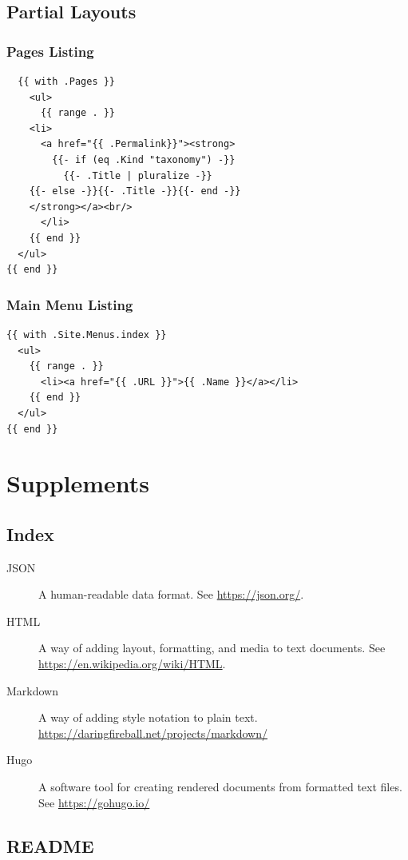\documentclass[11pt]{article}
\begin{document}
\subsection*{Partial Layouts}
\label{sec:orgff63913}
\subsubsection*{Pages Listing}
\label{sec:orgb986bf1}
\begin{verbatim}
  {{ with .Pages }}
    <ul>
      {{ range . }}
	<li>
	  <a href="{{ .Permalink}}"><strong>
	    {{- if (eq .Kind "taxonomy") -}}
	      {{- .Title | pluralize -}}
	{{- else -}}{{- .Title -}}{{- end -}}
	</strong></a><br/>
      </li>
    {{ end }}
  </ul>
{{ end }}
\end{verbatim}
\subsubsection*{Main Menu Listing}
\label{sec:orgeb90bc5}
\begin{verbatim}
{{ with .Site.Menus.index }}
  <ul>
    {{ range . }}
      <li><a href="{{ .URL }}">{{ .Name }}</a></li>
    {{ end }}
  </ul>
{{ end }}
\end{verbatim}
\stopcontents[level-1]
\section*{Supplements}
\label{sec:org1ddd15b}
\startcontents[level-1]
\subsection*{Index}
\label{sec:org9615c52}
\begin{description}
\item[{JSON}] A human-readable data format. See \href{https://json.org/}{https://json.org/}.
\item[{HTML}] A way of adding layout, formatting, and media to text documents. See \href{https://en.wikipedia.org/wiki/HTML}{https://en.wikipedia.org/wiki/HTML}.
\item[{Markdown}] A way of adding style notation to plain text. \url{https://daringfireball.net/projects/markdown/}
\item[{Hugo}] A software tool for creating rendered documents from formatted text files. See \href{https://gohugo.io/}{https://gohugo.io/}
\end{description}
\subsection*{README}
\label{sec:orge47c0d3}
\end{document}
